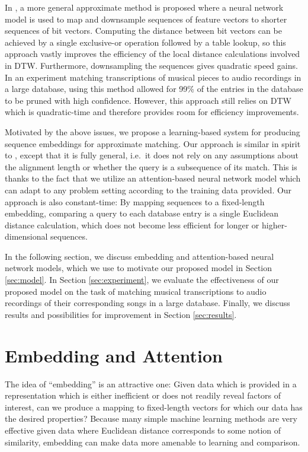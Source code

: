 \documentclass{article}
\begin{document}
In \cite{raffel2015large}, a more general approximate method is proposed where a neural network model is used to map and downsample sequences of feature vectors to shorter sequences of bit vectors.
Computing the distance between bit vectors can be achieved by a single exclusive-or operation followed by a table lookup, so this approach vastly improves the efficiency of the local distance calculations involved in DTW.
Furthermore, downsampling the sequences gives quadratic speed gains.
In an experiment matching transcriptions of musical pieces to audio recordings in a large database, using this method allowed for 99\% of the entries in the database to be pruned with high confidence.
However, this approach still relies on DTW which is quadratic-time and therefore provides room for efficiency improvements.

Motivated by the above issues, we propose a learning-based system for producing sequence embeddings for approximate matching.
Our approach is similar in spirit to \cite{papapetrou2011embedding}, except that it is fully general, i.e.\ it does not rely on any assumptions about the alignment length or whether the query is a subsequence of its match.
This is thanks to the fact that we utilize an attention-based neural network model which can adapt to any problem setting according to the training data provided.
Our approach is also constant-time: By mapping sequences to a fixed-length embedding, comparing a query to each database entry is a single Euclidean distance calculation, which does not become less efficient for longer or higher-dimensional sequences.

In the following section, we discuss embedding and attention-based neural network models, which we use to motivate our proposed model in Section \ref{sec:model}.
In Section \ref{sec:experiment}, we evaluate the effectiveness of our proposed model on the task of matching musical transcriptions to audio recordings of their corresponding songs in a large database.
Finally, we discuss results and possibilities for improvement in Section \ref{sec:results}.

\section{Embedding and Attention}
\label{sec:embedding}

The idea of ``embedding'' is an attractive one: Given data which is provided in a representation which is either inefficient or does not readily reveal factors of interest, can we produce a mapping to fixed-length vectors for which our data has the desired properties?
Because many simple machine learning methods are very effective given data where Euclidean distance corresponds to some notion of similarity, embedding can make data more amenable to learning and comparison.
\end{document}
